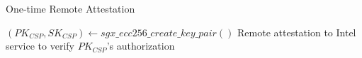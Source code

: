 \begin{algorithm}[h]
    \caption{One-time Remote Attestation}
    $(PK_{CSP}, SK_{CSP}) \leftarrow sgx\_ecc256\_create\_key\_pair()$\;
    Remote attestation to Intel service to verify $PK_{CSP}$'s authorization\;
    \KwRet{}\;
\label{algo:attestation}
\end{algorithm}